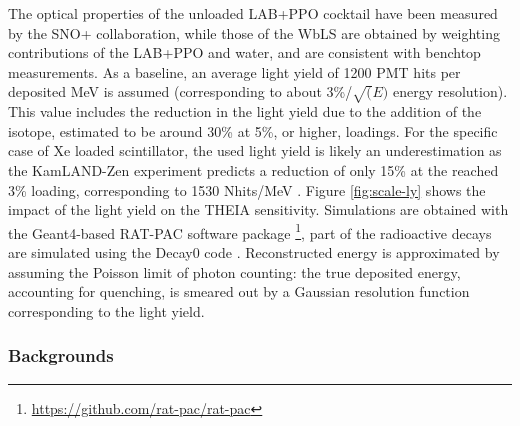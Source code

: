 The optical properties of the unloaded LAB+PPO cocktail have been measured by the SNO+ collaboration, while those of the WbLS are obtained by weighting contributions of the LAB+PPO and water, and are consistent with benchtop measurements. As a baseline, an average light yield of 1200 PMT hits per deposited MeV is assumed (corresponding to about 3\%/$\sqrt(E)$ energy resolution). This value includes the reduction in the light yield due to the addition of the isotope, estimated to be around 30\% at 5\%, or higher, loadings. For the specific case of Xe loaded scintillator, the used light yield is likely an underestimation as the KamLAND-Zen experiment predicts a reduction of only 15\% at the reached 3\% loading, corresponding to 1530 Nhits/MeV \cite{KZ-2011}. Figure \ref{fig:scale-ly} shows the impact of the light yield on the THEIA sensitivity. 
Simulations are obtained with the Geant4-based RAT-PAC software package \footnote{\url{https://github.com/rat-pac/rat-pac}}, part of the radioactive decays are simulated using the Decay0 code \cite{decay0}. Reconstructed energy is approximated by assuming the Poisson limit of
photon counting: the true deposited energy, accounting for quenching, is smeared out by a Gaussian resolution function corresponding to the light
yield.

\subsubsection{Backgrounds}


